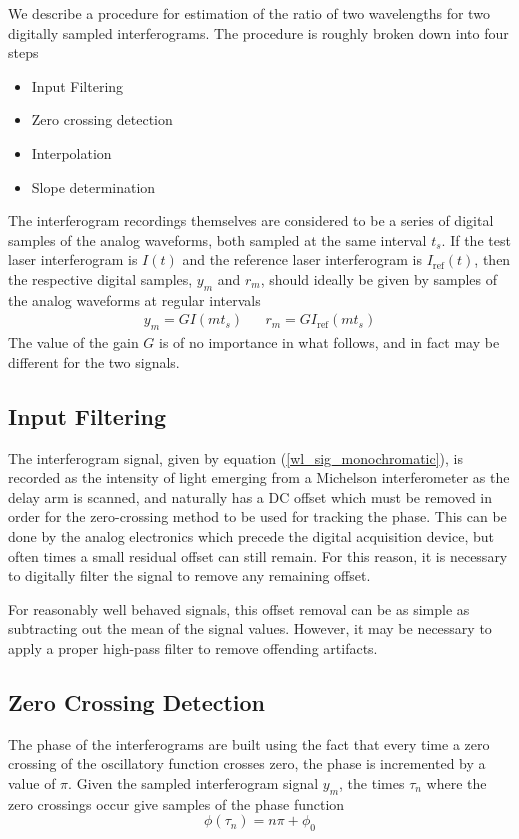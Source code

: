 We describe a procedure for estimation of the ratio of two wavelengths for two digitally sampled interferograms. The procedure is roughly broken down into four steps
\begin{itemize}
	\item Input Filtering
	\item Zero crossing detection
	\item Interpolation
	\item Slope determination
\end{itemize}

The interferogram recordings themselves are considered to be a series of digital samples of the analog waveforms, both sampled at the same interval $t_s$. If the test laser interferogram is $I(t)$ and the reference laser interferogram is $I_\mathrm{ref}(t)$, then the respective digital samples, $y_m$ and $r_m$, should ideally be given by samples of the analog waveforms at regular intervals
\begin{eqnarray}
	y_m = G I(m t_s) && r_m = G I_\mathrm{ref}(m t_s)
\end{eqnarray}
The value of the gain $G$ is of no importance in what follows, and in fact may be different for the two signals.

\subsection{Input Filtering}
The interferogram signal, given by equation (\ref{wl_sig_monochromatic}), is recorded as the intensity of light emerging from a Michelson interferometer as the delay arm is scanned, and naturally has a DC offset which must be removed in order for the zero-crossing method to be used for tracking the phase. This can be done by the analog electronics which precede the digital acquisition device, but often times a small residual offset can still remain. For this reason, it is necessary to digitally filter the signal to remove any remaining offset.

For reasonably well behaved signals, this offset removal can be as simple as subtracting out the mean of the signal values. However, it may be necessary to apply a proper high-pass filter to remove offending artifacts.

\subsection{Zero Crossing Detection}
The phase of the interferograms are built using the fact that every time a zero crossing of the oscillatory function crosses zero, the phase is incremented by a value of $\pi$. Given the sampled interferogram signal $y_m$, the times $\tau_n$ where the zero crossings occur give samples of the phase function
\begin{equation}
	\phi(\tau_n) = n\pi + \phi_0
\end{equation}

